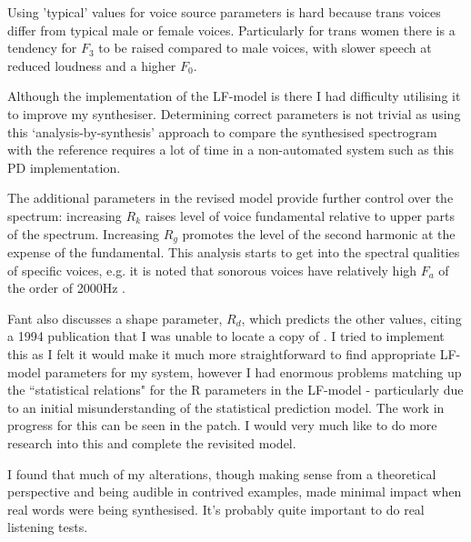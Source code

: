 Using 'typical' values for voice source parameters is hard because trans voices differ from typical male or female voices. \cite{Gunzburger1995} Particularly for trans women there is a tendency for $F_3$ to be raised compared to male voices, with slower speech at reduced loudness and a higher $F_0$. 

Although the implementation of the LF-model is there I had difficulty utilising it to improve my synthesiser. Determining correct parameters is not trivial as using this `analysis-by-synthesis' approach to compare the synthesised spectrogram with the reference requires a lot of time in a non-automated system such as this PD implementation.

The additional parameters in the revised model \cite{Fant1995} provide further control over the spectrum: increasing $R_k$ raises level of voice fundamental relative to upper parts of the spectrum. Increasing $R_g$ promotes the level of the second harmonic at the expense of the fundamental. This analysis starts to get into the spectral qualities of specific voices, e.g. it is noted that sonorous voices have relatively high $F_a$ of the order of \si{2000Hz} \cite{Fant1995}.

Fant also discusses a shape parameter, $R_d$, which predicts the other values, citing a 1994 publication that I was unable to locate a copy of \cite{Fant1994}. I tried to implement this as I felt it would make it much more straightforward to find appropriate LF-model parameters for my system, however I had enormous problems matching up the ``statistical relations" for the R parameters in the LF-model \cite{Fant1995} - particularly due to an initial misunderstanding of the statistical prediction model. The work in progress for this can be seen in the  patch. I would very much like to do more research into this and complete the revisited model.

I found that much of my alterations, though making sense from a theoretical perspective and being audible in contrived examples, made minimal impact when real words were being synthesised. It's probably quite important to do real listening tests.

